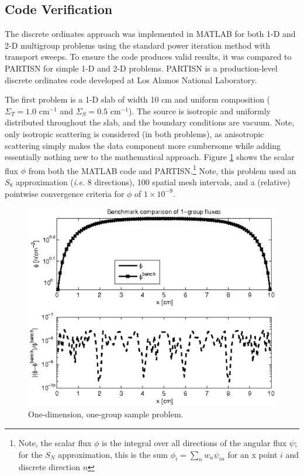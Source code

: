 \documentclass[final,3p,times,11pt]{elsarticle}
\newcommand{\ie}{{\it i.e. }}
\begin{document}
\subsection{Code Verification}

  The discrete ordinates approach was implemented in MATLAB for both 1-D and 2-D multigroup problems using the standard power iteration method with transport sweeps.   To ensure the code produces valid results, it was compared to PARTISN for simple 1-D and 2-D problems.  PARTISN is a production-level discrete ordinates code developed at Los Alamos National Laboratory.

  The first problem is a 1-D slab of width 10 cm and uniform composition ( $\Sigma_T=1.0$ cm$^{-1}$ and $\Sigma_S = 0.5$ cm$^{-1}$).  The source is isotropic and uniformly distributed throughout the slab, and the boundary conditions are vacuum. Note, only isotropic scattering is considered (in both problems), as anisotropic scattering simply makes the data component more cumbersome while adding essentially nothing new to the mathematical approach.  Figure \ref{fig:one_d_comp} shows the scalar flux $\phi$ from both the MATLAB code and PARTISN.\footnote{Note, the scalar flux $\phi$ is the integral over all directions of the angular flux $\psi$; for the $S_N$ approximation, this is the sum $\phi_i = \sum_n w_n \psi_{in}$ for an x point $i$ and discrete direction $n$} Note, this problem used an $S_8$ approximation (\ie 8 directions), 100 spatial mesh intervals, and a (relative) pointwise convergence criteria for $\phi$ of $1\times 10^{-9}$. 

  \begin{figure}[ht] 
      \centering
      \includegraphics[keepaspectratio, width = 4.0 in]{one_d_comp}
      \caption{One-dimension, one-group sample problem.}
      \label{fig:one_d_comp}
  \end{figure}
\end{document}
